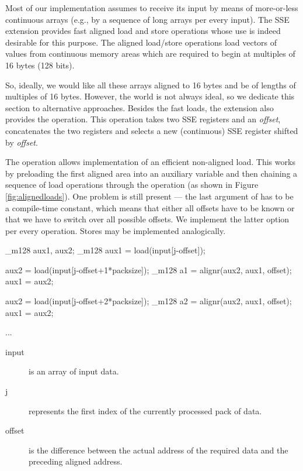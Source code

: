 \label{sec:preloads}
Most of our implementation assumes to receive its input by means of more-or-less continuous arrays (e.g., by a sequence of long arrays per every input). The SSE extension provides fast aligned load and store operations whose use is indeed desirable for this purpose. The aligned load/store operations load vectors of values from continuous memory areas which are required to begin at multiples of 16 bytes (128 bits). 

So, ideally, we would like all these arrays aligned to 16 bytes and be of lengths of multiples of 16 bytes. However, the world is not always ideal, so we dedicate this section to alternative approaches. Besides the fast loads, the extension also provides the  operation. This operation takes two SSE registers and an \emph{offset}, concatenates the two registers and selects a new (continuous) SSE register shifted by \emph{offset}. 

The  operation allows implementation of an efficient non-aligned load. This works by preloading the first aligned area into an auxiliary variable and then chaining a sequence of load operations through the  operation (as shown in Figure \ref{fig:alignedloads}). One problem is still present --- the last argument of  has to be a compile-time constant, which means that either all offsets have to be known or that we have to switch over all possible offsets. We implement the latter option per every operation. Stores may be implemented analogically.

\mybeginfig
\begin{code}
_m128 aux1, aux2;
_m128 aux1 = load(input[j-offset]);

aux2 = load(input[j-offset+1*packsize]);
_m128 a1 = alignr(aux2, aux1, offset);
aux1 = aux2;

aux2 = load(input[j-offset+2*packsize]);
_m128 a2 = alignr(aux2, aux1, offset);
aux1 = aux2;

...
\end{code}
\begin{description}
  \item[input] is an array of input data.
  \item[j] represents the first index of the currently processed pack of data.
  \item[offset] is the difference between the actual address of the required data and the preceding aligned address.
\end{description}

